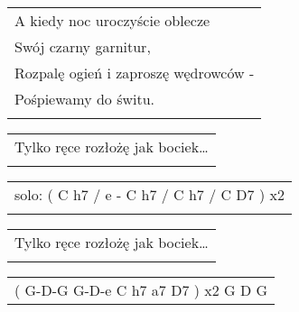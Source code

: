 \documentclass[a5paper]{article}
\begin{document}
\noindent
\begin{tabular}{@{}p{8.50cm}@{}}
A kiedy noc uroczyście oblecze \\
Swój czarny garnitur, \\
Rozpalę ogień i zaproszę wędrowców - \\
Pośpiewamy do świtu. \\ \\
\end{tabular}

\noindent
\begin{tabular}{@{}p{7.50cm}@{}}
Tylko ręce rozłożę jak bociek… \\ \\
\end{tabular}

\noindent
\begin{tabular}{@{}p{8.50cm}@{}}
solo: ( C h7 / e - C h7 / C h7 / C D7 ) x2 \\ \\
\end{tabular}

\noindent
\begin{tabular}{@{}p{7.50cm}@{}}
Tylko ręce rozłożę jak bociek… \\ \\
\end{tabular}
 
\noindent
\begin{tabular}{@{}p{8.50cm}@{}}
( G-D-G G-D-e C h7 a7 D7 ) x2 G D G
\end{tabular}
\end{document}
